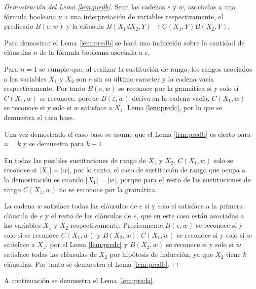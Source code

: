 \documentclass[12pt]{article}
\begin{document}
\begin{proof}[Demostración del Lema \ref{lem:predb}]
    Sean las cadenas $e$ y $w$, asociadas a una fórmula booleana y a una interpretación de variables respectivamente, 
    el predicado $B(e,w)$ y la cláusula $B(X_1dX_2,Y)\to C(X_1,Y) B(X_2,Y)$. 
    
    Para demostrar el Lema \ref{lem:predb}
    se hará una inducción sobre la cantidad de cláusulas $n$ de la fórmula booleana asociada a $e$.
    
    Para $n=1$ se cumple que, al realizar la sustitución de rango, los rangos asociados a las variables $X_1$ y 
    $X_2$ son $e$ sin su último caracter y la cadena vacía respectivamente. Por tanto $B(e,w)$ se reconoce por 
    la gramática si y solo si $C(X_1,w)$ se reconoce, porque $B(\varepsilon, w)$ deriva en la cadena vacía.
    $C(X_1,w)$ se reconoce si y solo si $w$ satisface a $X_1$, Lema \ref{lem:predc}, por lo 
    que se demuestra el caso base.
    
    Una vez demostrado el caso base se asume que el Lema \ref{lem:predb} es cierto para $n=k$ y se demuestra para $k+1$.
    
    En todas las posibles sustituciones de rango de $X_1$ y $X_2$, $C(X_1,w)$ solo se reconoce si $|X_1|=|w|$, por lo tanto, 
    el caso de sustitución de rango que ocupa a la demostración es cuando $|X_1|=|w|$, porque para el resto de las sustituciones 
    de rango $C(X_1,w)$ no se reconoce por la gramática.
    
    La cadena $w$ satisface todas las cláusulas de $e$ si y solo si satisface a la primera cláusula de $e$ y el resto de las cláusulas de $e$, 
    que en este caso están asociadas a las variables $X_1$ y $X_2$ respectivamente.  
    Precisamente $B(e,w)$ se reconoce si y solo si se reconoce $C(X_1,w)$ y $B(X_2,w)$.  $C(X_1,w)$ se reconoce si y solo si $w$ satisface a $X_1$, 
    por el Lema \ref{lem:predc} y $B(X_2,w)$ se reconoce si y solo si $w$ satisface todas las cláusulas de $X_2$ por hipótesis de inducción, ya que $X_2$ tiene $k$ cláusulas. Por tanto se demuestra el Lema \ref{lem:predb}.
\end{proof}

A continuación se demuestra el Lema \ref{lem:preda}.
\end{document}
